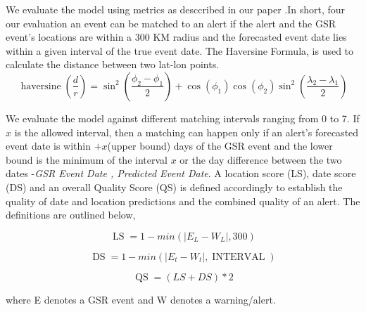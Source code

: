 We evaluate the model using metrics as desccribed in our paper \cite{embersKDD}.In short, four our evaluation an event can be matched to an alert if the alert and the GSR event's locations are within a 300 KM radius and the forecasted event date lies within a given interval of the true event date. The Haversine Formula, is used to calculate the distance between two lat-lon points.
$$\operatorname{haversine}\left(\frac{d}{r}\right) = \sin^2(\frac{\phi_2 - \phi_1}{2}) + \cos(\phi_1) \cos(\phi_2) \sin^2(\frac{\lambda_2-\lambda_1}{2}) $$


We evaluate the model against different matching intervals ranging from 0 to 7. If $x$ is the allowed interval, then a matching can happen only if an alert's forecasted event date is within $+x$(upper bound) days of the GSR event and the lower bound is the minimum of the interval $x$ or the day difference between the two dates -\emph{GSR Event Date , Predicted Event Date}. A location score (LS), date score (DS) and an overall Quality Score (QS) is defined accordingly to establish the quality of date and location predictions and the combined quality of an alert. The definitions are outlined below,

\begin{equation}
    \operatorname{LS}=1 - min(|E_L-W_L|, 300)
\end{equation}

\begin{equation}
    \operatorname{DS}=1 - min(|E_t-W_t|, \operatorname{INTERVAL})
\end{equation}


\begin{equation}
    \operatorname{QS}= (LS + DS)*2
\end{equation}

where E denotes a GSR event and W denotes a warning/alert.



